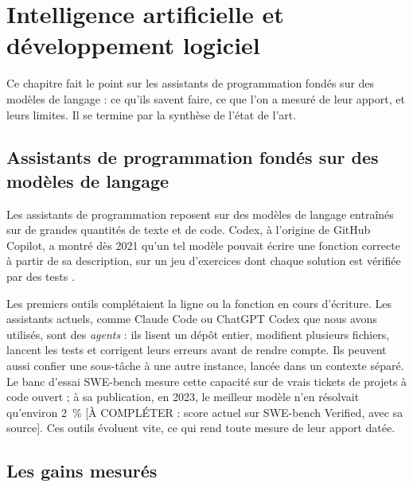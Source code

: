 
\chapter{Intelligence artificielle et développement logiciel}\label{chap:ia}

Ce chapitre fait le point sur les assistants de programmation fondés sur des
modèles de langage : ce qu'ils savent faire, ce que l'on a mesuré de leur
apport, et leurs limites. Il se termine par la synthèse de l'état de l'art.

\section{Assistants de programmation fondés sur des modèles de langage}

Les assistants de programmation reposent sur des modèles de langage entraînés
sur de grandes quantités de texte et de code. Codex, à l'origine de GitHub
Copilot, a montré dès 2021 qu'un tel modèle pouvait écrire une fonction
correcte à partir de sa description, sur un jeu d'exercices dont chaque
solution est vérifiée par des tests \cite{chen2021codex}.

Les premiers outils complétaient la ligne ou la fonction en cours
d'écriture. Les assistants actuels, comme Claude Code ou ChatGPT Codex que
nous avons utilisés, sont des \emph{agents} : ils lisent un dépôt entier,
modifient plusieurs fichiers, lancent les tests et corrigent leurs erreurs
avant de rendre compte. Ils peuvent aussi confier une sous-tâche à une autre
instance, lancée dans un contexte séparé. Le banc d'essai SWE-bench mesure
cette capacité sur de vrais tickets de projets à code ouvert ; à sa
publication, en 2023, le meilleur modèle n'en résolvait qu'environ
\SI{2}{\percent} \cite{jimenez2024swebench} [À COMPLÉTER : score actuel sur
SWE-bench Verified, avec sa source]. Ces outils évoluent vite, ce qui rend
toute mesure de leur apport datée.

\section{Les gains mesurés}

